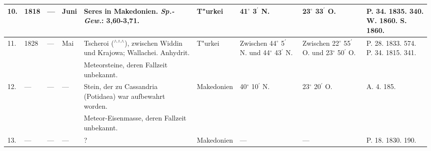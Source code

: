 \documentclass[a4paper, 8pt, oneside, polutonikogreek, german]{article}
\begin{document}
\begin{center}
\begin{longtable}{|p{3mm}|p{12mm}|p{5mm}|p{13mm}|p{25mm}|p{15mm}|p{10mm}|p{10mm}|p{11mm}|}
        10. & 1818 & --- & Juni & Seres in Makedonien. \emph{Sp.-Gew.}: 3,60-3,71. & T"urkei & 41$^\circ$ 3$^\prime$ N. & 23$^\circ$ 33$^\prime$ O. & P. 34. 1835. 340. W. 1860. S. 1860. \\ \hline
        11. & 1828 & --- & Mai & Tscheroi ($^\wedge$$^\wedge$$^\wedge$), zwischen Widdin und Krajowa; Wallachei. Anhydrit. & T"urkei & Zwischen 44$^\circ$ 5$^\prime$ N. und 44$^\circ$ 43$^\prime$ N. & Zwischen 22$^\circ$ 55$^\prime$ O. und 23$^\circ$ 50$^\prime$ O. & P. 28. 1833. 574. P. 34. 1815. 341. \\ \hline
          &   &   &   & Meteorsteine, deren Fallzeit unbekannt. &   &   &   &   \\ \hline
        12. & --- & --- & --- & Stein, der zu Cassandria (Potidaea) war aufbewahrt worden. & Makedonien & 40$^\circ$ 10$^\prime$ N. & 23$^\circ$ 20$^\prime$ O. & A. 4. 185. \\ \hline
          &   &   &   & Meteor-Eisenmasse, deren Fallzeit unbekannt. &   &   &   &   \\ \hline
        13. & --- & --- & --- & ? & Makedonien & --- & --- & P. 18. 1830. 190. \\ \hline
    \end{longtable}
\end{center}
\clearpage
\subsection{}
\subsubsection{}
\end{document}

